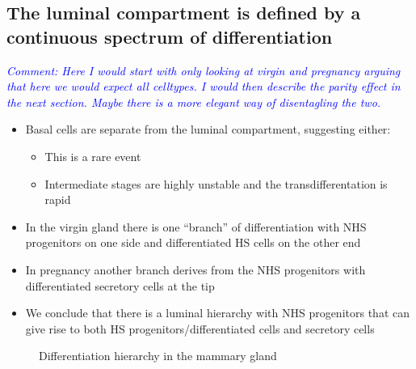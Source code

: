 \documentclass[oneside]{amsart}
\newcommand{\comment}[1]{\textit{\textcolor{blue}{Comment: #1}}}
\begin{document}
\newpage
\subsection{The luminal compartment is defined by a continuous spectrum of differentiation\label{sec:LumDiff}}
\comment{Here I would start with only looking at virgin and pregnancy arguing that here we would expect all celltypes. 
I would then describe the parity effect in the next section. Maybe there is a more elegant way of disentagling the two.}
\begin{itemize}
    \item Basal cells are separate from the luminal compartment, suggesting either:
	\begin{itemize}
	    \item This is a rare event 
	    \item Intermediate stages are highly unstable and the transdifferentation is rapid
	\end{itemize}
    \item In the virgin gland there is one ``branch'' of differentiation with NHS progenitors on one side and differentiated HS cells on the other end
    \item In pregnancy another branch derives from the NHS progenitors with differentiated secretory cells at the tip
    \item We conclude that there is a luminal hierarchy with NHS progenitors that can give rise to both HS progenitors/differentiated cells and secretory cells
\end{itemize}

\begin{figure}[h]
\begin{subfigure}{0.45\linewidth}
\centering %
\caption{}
\end{subfigure}
\begin{subfigure}{0.45\linewidth}
\caption{}
\end{subfigure}
\begin{subfigure}{0.45\linewidth}
\centering %
\caption{}
\end{subfigure}
\caption{Differentiation hierarchy in the mammary gland}
      \label{fig:f2}
  \end{figure}
  
\end{document}
